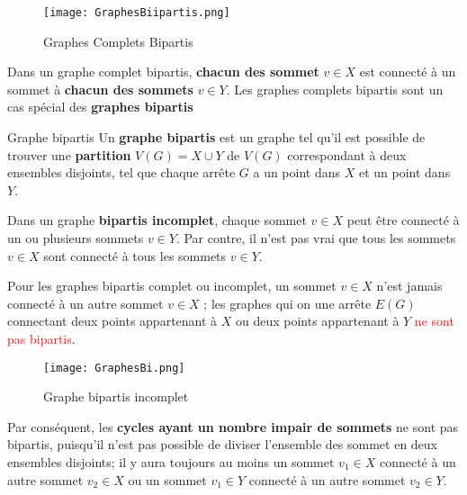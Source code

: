 \documentclass[16pt]{report}
\begin{document}
\begin{multicols*}{2}
            \begin{figure}[H]
                \begin{center}
                    \texttt{[image: GraphesBiipartis.png]}
                \end{center}
                \caption{Graphes Complets Bipartis}
            \end{figure}
            Dans un graphe complet bipartis, \textbf{chacun des sommet} $v \in X$ est connecté à un 
            sommet à \textbf{chacun des sommets} $v \in Y$. 
            Les graphes complets bipartis sont un cas spécial des \textbf{graphes bipartis}
            \begin{Definitionx}{Graphe bipartis}{}
                Un \textbf{graphe bipartis} est un graphe tel qu'il est possible de trouver une \textbf{partition}
                $V(G) = X \cup Y$ de $V(G)$ correspondant à deux ensembles disjoints, tel que 
                chaque arrête $G$ a un point dans $X$ et un point dans $Y$. 
             \end{Definitionx}
             Dans un graphe \textbf{bipartis incomplet}, chaque sommet $v \in X$ peut être connecté 
             à un ou plusieurs sommets $v \in Y$. Par contre, il n'est pas vrai que 
             tous les sommets $v \in X$ sont connecté à tous les sommets $v \in Y$. 

             Pour les graphes bipartis complet ou incomplet, un sommet $v \in X$ n'est jamais connecté 
             à un autre sommet $v \in X$ ; les graphes qui on une arrête $E(G)$ connectant deux points 
             appartenant à $X$ ou deux points appartenant à $Y$ \textcolor{red}{ne sont pas bipartis}.   

             \begin{figure}[H]
                \begin{center}
                    \texttt{[image: GraphesBi.png]}
                \end{center}
                \caption{Graphe bipartis incomplet}
             \end{figure}


             Par conséquent, les \textbf{cycles ayant un nombre impair de sommets} ne sont pas bipartis, 
             puisqu'il n'est pas possible de diviser l'ensemble des sommet en deux ensembles disjoints; 
             il y aura toujours au moins un sommet $v_1 \in X$ connecté à un autre sommet $v_2 \in X$ ou un sommet
             $v_1 \in Y$ connecté à un autre sommet $v_2 \in Y$. 


\end{multicols*}
\end{document}
